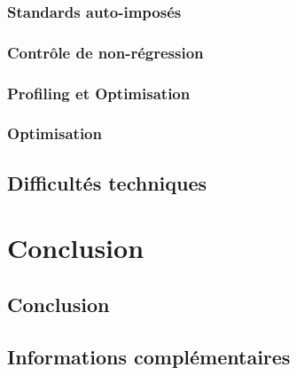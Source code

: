 \documentclass[a4paper,10pt]{report}
\begin{document}
\subsection{Standards auto-imposés}



\subsection{Contrôle de non-régression}

\subsection{Profiling et Optimisation}

\subsection{Optimisation}

\section{Difficultés techniques}

\chapter{Conclusion}
\section{Conclusion}


\section{Informations complémentaires}
\end{document}
